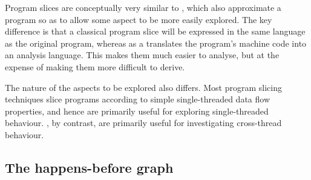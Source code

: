 Program slices are conceptually very similar to {\StateMachines},
which also approximate a program so as to allow some aspect to be more
easily explored.  The key difference is that a classical program slice
will be expressed in the same language as the original program,
whereas as a {\StateMachine} translates the program's machine code
into an analysis language.  This makes them much easier to analyse,
but at the expense of making them more difficult to derive.

 The nature of the aspects to be explored
also differs.  Most program slicing techniques slice programs
according to simple single-threaded data flow properties, and hence
are primarily useful for exploring single-threaded behaviour.
{\Technique} {\StateMachines}, by contrast, are primarily useful for
investigating cross-thread behaviour.

\subsection{The happens-before graph}

